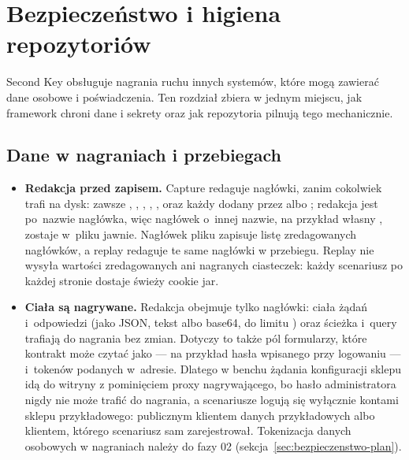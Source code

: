 \section{Bezpieczeństwo i higiena repozytoriów}\label{sec:bezpieczenstwo}

Second Key obsługuje nagrania ruchu innych systemów, które mogą zawierać dane osobowe i
poświadczenia. Ten rozdział zbiera w jednym miejscu, jak framework chroni dane i sekrety
oraz jak repozytoria pilnują tego mechanicznie.

\subsection{Dane w nagraniach i przebiegach}\label{sec:bezpieczenstwo-dane}

\begin{itemize}
  \item \textbf{Redakcja przed zapisem.} Capture redaguje nagłówki, zanim cokolwiek
        trafi na dysk: zawsze , ,
        , , , oraz każdy dodany
        przez  albo ; redakcja jest
        po~nazwie nagłówka, więc nagłówek o~innej nazwie, na przykład własny
        , zostaje w~pliku jawnie. Nagłówek
        pliku  zapisuje listę zredagowanych nagłówków, a replay redaguje
        te same nagłówki w przebiegu. Replay nie wysyła wartości zredagowanych ani
        nagranych ciasteczek: każdy scenariusz po każdej stronie dostaje świeży cookie jar.
  \item \textbf{Ciała są nagrywane.} Redakcja obejmuje tylko nagłówki: ciała żądań
        i~odpowiedzi (jako JSON, tekst albo base64, do limitu )
        oraz ścieżka i~query trafiają do nagrania bez zmian. Dotyczy to także pól formularzy,
        które kontrakt może czytać jako  --- na przykład
        hasła wpisanego przy logowaniu --- i~tokenów podanych w~adresie.
        Dlatego w benchu żądania konfiguracji sklepu idą do witryny z pominięciem proxy
        nagrywającego, bo hasło administratora nigdy nie może trafić do nagrania,
        a scenariusze logują się wyłącznie kontami sklepu przykładowego: publicznym klientem
        danych przykładowych albo klientem, którego scenariusz sam zarejestrował.
        Tokenizacja danych osobowych w nagraniach należy do fazy 02
        (sekcja~\ref{sec:bezpieczenstwo-plan}).

\end{itemize}
